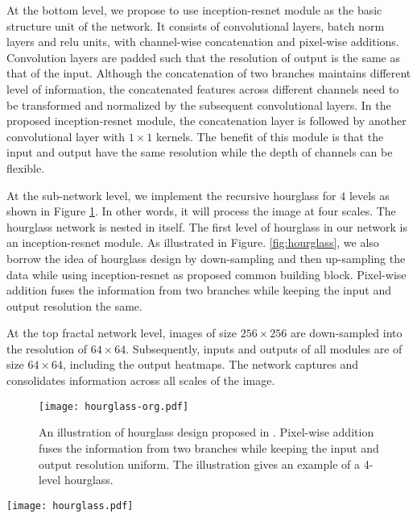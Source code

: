 \documentclass[journal ]{IEEEtran}
\begin{document}
At the bottom level, we propose to use inception-resnet module as the basic structure unit of the network. It consists of convolutional layers, batch norm layers and relu units, with channel-wise concatenation and pixel-wise additions.
Convolution layers are padded such that the resolution of output is the same as that of the input. 
Although the concatenation of two branches maintains different level of information, the concatenated features across different channels need to be transformed and normalized by the subsequent convolutional layers. In the proposed inception-resnet module, the concatenation layer is followed by another convolutional layer with $1 \times 1$ kernels. 
The benefit of this module is that the input and output have the same resolution while the depth of channels can be flexible. 

At the sub-network level, we implement the recursive hourglass for $4$ levels as shown in Figure \ref{fig:hourglass-org}. In other words, it will process the image at four scales. The hourglass network is nested in itself. The first level of hourglass in our network is an inception-resnet module.
As illustrated in Figure. \ref{fig:hourglass}, we also borrow the idea of hourglass design by down-sampling and then up-sampling the data while using inception-resnet as proposed common building block. 
Pixel-wise addition fuses the information from two branches while keeping the input and output resolution the same.

At the top fractal network level, images of size $256 \times 256$ are down-sampled into the resolution of $64 \times 64$. Subsequently, inputs and outputs of all modules are of size $64 \times 64$, including the output heatmaps. 
The network captures and consolidates information across all scales of the image. 

\begin{figure}
	\begin{center}
		\texttt{[image: hourglass-org.pdf]}
	\end{center}
	\caption{An illustration of hourglass design proposed in \cite{newell2016stacked}. Pixel-wise addition fuses the information from two branches while keeping the input and output resolution uniform. The illustration gives an example of a 4-level hourglass.}
	\label{fig:hourglass-org}
\end{figure}

\begin{figure*}
	\begin{center}
		\texttt{[image: hourglass.pdf]}
	\end{center}
	\caption{\textbf{Improved hourglass sub-network}. While using inception-resnet as proposed common building block, we borrow the idea of hourglass design by down-sampling and then up-sampling the dataflow in one branch, maintaining the resolution of the other branch. The lowest level of the recursive hourglass in our network is an inception-resnet module.}
	\label{fig:hourglass}
\end{figure*}
\end{document}
